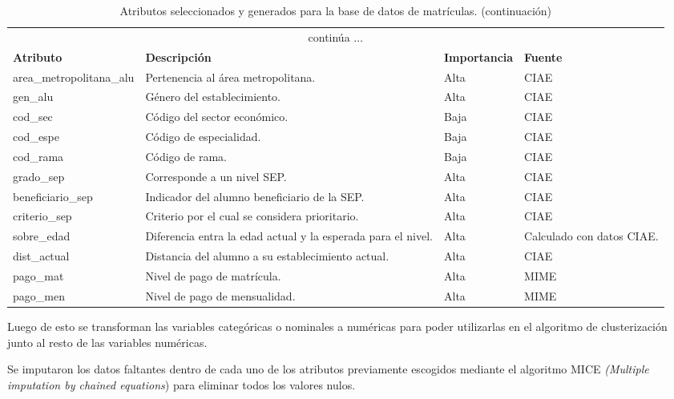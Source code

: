 \begin{footnotesize}
\begin{longtable}{|p{}|p{}|p{}|p{}|}
\caption{Atributos seleccionados y generados para la base de datos de matrículas.}\label{tab:atributos_matriculas}\\
\hline
\endfirsthead
\caption[]{Atributos seleccionados y generados para la base de datos de matrículas. (continuación)}\\
\hline
\endhead
\hline
\multicolumn{4}{|c|}{continúa $\ldots$}\\
\hline
\endfoot
\hline
\endlastfoot
\textbf{Atributo}  & \textbf{Descripción} & \textbf{Importancia} & \textbf{Fuente} \\ \hline
area\_metropolitana\_alu & Pertenencia al área metropolitana. & Alta & CIAE \\ \hline
gen\_alu & Género del establecimiento. & Alta & CIAE \\ \hline
cod\_sec & Código del sector económico. & Baja & CIAE \\ \hline
cod\_espe & Código de especialidad. & Baja & CIAE \\ \hline
cod\_rama & Código de rama. & Baja & CIAE \\ \hline
grado\_sep & Corresponde a un nivel SEP. & Alta & CIAE \\ \hline
beneficiario\_sep & Indicador del alumno beneficiario de la SEP. & Alta & CIAE \\ \hline
criterio\_sep & Criterio por el cual se considera prioritario. & Alta & CIAE \\ \hline
sobre\_edad & Diferencia entra la edad actual y la esperada para el nivel. & Alta & Calculado con datos CIAE.\\ \hline
dist\_actual & Distancia del alumno a su establecimiento actual. & Alta & CIAE \\ \hline
pago\_mat & Nivel de pago de matrícula. & Alta & MIME \\ \hline
pago\_men & Nivel de pago de mensualidad. & Alta & MIME \\ \hline
\end{longtable} 
\end{footnotesize}

Luego de esto se transforman las variables categóricas o nominales a numéricas para poder utilizarlas en el algoritmo de clusterización junto al resto de las variables numéricas.

Se imputaron los datos faltantes dentro de cada uno de los atributos previamente escogidos mediante el algoritmo MICE \textit{(Multiple imputation by chained equations}) para eliminar todos los valores nulos.